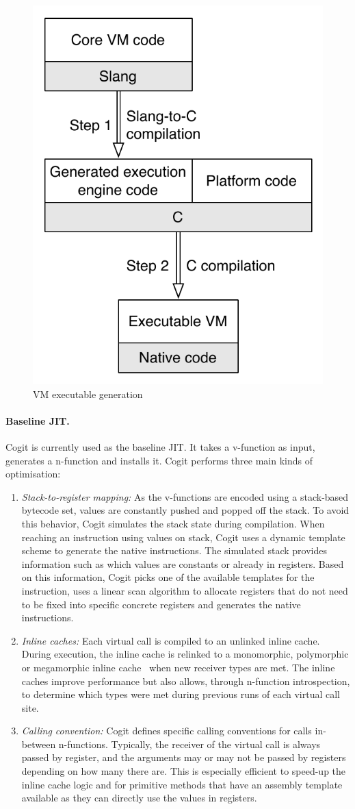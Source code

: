 \documentclass[a4paper,12pt,twoside]{../includes/ThesisStyle}
\begin{document}
\begin{figure}[h!]
    \begin{center}
        \includegraphics[width=0.45\linewidth]{VMCompilation}
        \caption{VM executable generation}
        \label{fig:VMCompilation}
    \end{center}
\end{figure}

\paragraph{Baseline JIT.}
Cogit is currently used as the baseline JIT. It takes a v-function as input, generates a n-function and installs it. Cogit performs three main kinds of optimisation:
\begin{enumerate}
	\item \emph{Stack-to-register mapping:} As the v-functions are encoded using a stack-based bytecode set, values are constantly pushed and popped off the stack. To avoid this behavior, Cogit simulates the stack state during compilation. When reaching an instruction using values on stack, Cogit uses a dynamic template scheme to generate the native instructions. The simulated stack provides information such as which values are constants or already in registers. Based on this information, Cogit picks one of the available templates for the instruction, uses a linear scan algorithm to allocate registers that do not need to be fixed into specific concrete registers and generates the native instructions.
	\item \emph{Inline caches:} Each virtual call is compiled to an unlinked inline cache. During execution, the inline cache is relinked to a monomorphic, polymorphic or megamorphic inline cache~\cite{Deut84a,Holz91a} when new receiver types are met. The inline caches improve performance but also allows, through n-function introspection, to determine which types were met during previous runs of each virtual call site.
	\item \emph{Calling convention:} Cogit defines specific calling conventions for calls in-between n-functions. Typically, the receiver of the virtual call is always passed by register, and the arguments may or may not be passed by registers depending on how many there are. This is especially efficient to speed-up the inline cache logic and for primitive methods that have an assembly template available as they can directly use the values in registers.
\end{enumerate}
\end{document}
